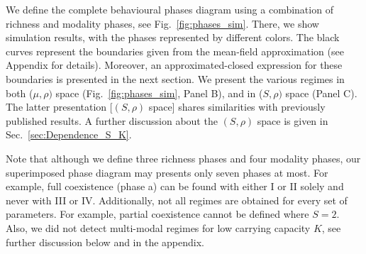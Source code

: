 \documentclass[9pt,lineno]{elife}
\begin{document}
We define the complete behavioural phases diagram using a combination of richness and modality phases, see  Fig.~\ref{fig:phases_sim}. 
There, we show simulation results, with the phases represented by different colors. 
The black curves represent the boundaries given from the mean-field approximation (see Appendix for details). Moreover, an approximated-closed expression for these boundaries is presented in the next section. 
We present the various regimes in both  ($\mu,\rho)$ space (Fig.~\ref{fig:phases_sim}, Panel B), and in ($S,\rho)$ space (Panel C). 
The latter presentation [$(S,\rho)$ space] shares similarities with previously published results. 
A further discussion about the $(S,\rho)$ space is given in Sec.~\ref{sec:Dependence_S_K}.

Note that although we define three richness phases and four modality phases, our superimposed phase diagram may presents only seven phases at most. 
For example, full coexistence (phase a) can be found with either I or II solely and never with III or IV.  
Additionally, not all regimes are obtained for every set of parameters. 
For example, partial coexistence cannot be defined where $S=2$. 
Also, we did not detect multi-modal regimes for low carrying capacity $K$, see further discussion below and in the appendix. 


\end{document}

